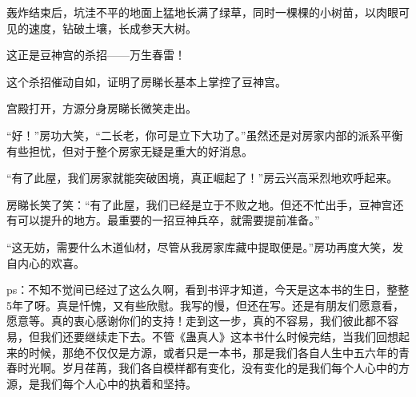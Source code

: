 \begin{this_body}
轰炸结束后，坑洼不平的地面上猛地长满了绿草，同时一棵棵的小树苗，以肉眼可见的速度，钻破土壤，长成参天大树。

这正是豆神宫的杀招——万生春雷！

这个杀招催动自如，证明了房睇长基本上掌控了豆神宫。

宫殿打开，方源分身房睇长微笑走出。

“好！”房功大笑，“二长老，你可是立下大功了。”虽然还是对房家内部的派系平衡有些担忧，但对于整个房家无疑是重大的好消息。

“有了此屋，我们房家就能突破困境，真正崛起了！”房云兴高采烈地欢呼起来。

房睇长笑了笑：“有了此屋，我们已经是立于不败之地。但还不忙出手，豆神宫还有可以提升的地方。最重要的一招豆神兵卒，就需要提前准备。”

“这无妨，需要什么木道仙材，尽管从我房家库藏中提取便是。”房功再度大笑，发自内心的欢喜。

ps：不知不觉间已经过了这么久啊，看到书评才知道，今天是这本书的生日，整整5年了呀。真是忏愧，又有些欣慰。我写的慢，但还在写。还是有朋友们愿意看，愿意等。真的衷心感谢你们的支持！走到这一步，真的不容易，我们彼此都不容易，但我们还要继续走下去。不管《蛊真人》这本书什么时候完结，当我们回想起来的时候，那绝不仅仅是方源，或者只是一本书，那是我们各自人生中五六年的青春时光啊。岁月荏苒，我们各自模样都有变化，没有变化的是我们每个人心中的方源，是我们每个人心中的执着和坚持。

\end{this_body}

